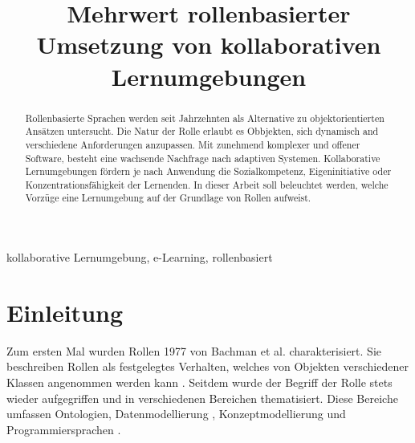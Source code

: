 \documentclass[conference]{IEEEtran}
\begin{document}
\title{Mehrwert rollenbasierter Umsetzung von kollaborativen Lernumgebungen\\}


\author{
}



\maketitle

\begin{abstract} Rollenbasierte Sprachen werden seit Jahrzehnten als Alternative zu objektorientierten Ansätzen untersucht. Die Natur der Rolle erlaubt es Obbjekten, sich dynamisch and verschiedene Anforderungen anzupassen. Mit zunehmend komplexer und offener Software, besteht eine wachsende Nachfrage nach adaptiven Systemen. Kollaborative Lernumgebungen fördern je nach Anwendung die Sozialkompetenz, Eigeninitiative oder Konzentrationsfähigkeit der Lernenden. In dieser Arbeit soll beleuchtet werden, welche Vorzüge eine Lernumgebung auf der Grundlage von Rollen aufweist.
\end{abstract}

\begin{IEEEkeywords}
kollaborative Lernumgebung, e-Learning, rollenbasiert
\end{IEEEkeywords}

\section{Einleitung}
Zum ersten Mal wurden Rollen 1977 von Bachman et al. charakterisiert. Sie beschreiben Rollen als festgelegtes Verhalten, welches von Objekten verschiedener Klassen angenommen werden kann \cite{bachman}. Seitdem wurde der Begriff der Rolle stets wieder aufgegriffen und in verschiedenen Bereichen thematisiert. Diese Bereiche umfassen Ontologien\cite{loebe2005abstract}\cite{guarino2009overview}, Datenmodellierung \cite{halpin2005orm}, Konzeptmodellierung \cite{hennicker2015model} und Programmiersprachen \cite{ubayashi2000roleep}. 
\end{document}
